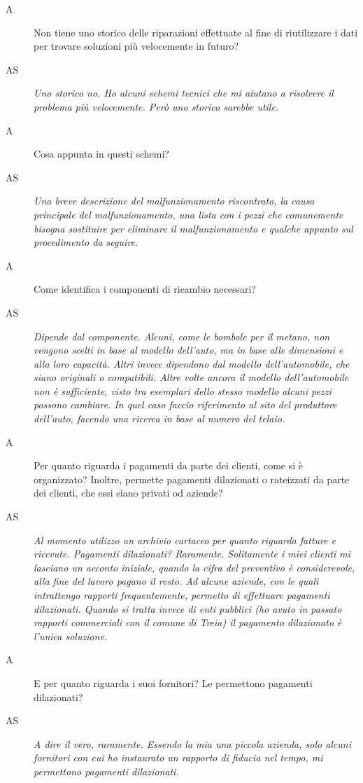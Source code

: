 \begin{description}
 			\item[A]
 				Non tiene uno storico delle riparazioni effettuate al fine di riutilizzare i dati per trovare soluzioni più velocemente in futuro?
 			\item[AS]
 				\emph{Uno storico no. Ho alcuni schemi tecnici che mi aiutano a risolvere il problema più velocemente. Però uno storico sarebbe utile.}
 			\item[A]
	 			Cosa appunta in questi schemi?
	 		\item[AS]
		 		\emph{Una breve descrizione del malfunzionamento riscontrato, la causa principale del malfunzionamento, una lista con i pezzi che comunemente bisogna sostituire per eliminare il malfunzionamento e qualche appunto sul procedimento da seguire.}
		 	\item[A]
			 	Come identifica i componenti di ricambio necessari?
			\item[AS]
				\emph{Dipende dal componente. Alcuni, come le bombole per il metano, non vengono scelti in base al modello dell'auto, ma in base alle dimensioni e alla loro capacità. Altri invece dipendono dal modello dell'automobile, che siano originali o compatibili. Altre volte ancora il modello dell'automobile non è sufficiente, visto tra esemplari dello stesso modello alcuni pezzi possono cambiare. In quel caso faccio riferimento al sito del produttore dell'auto, facendo una ricerca in base al numero del telaio.}
 			\item[A]
 				Per quanto riguarda i pagamenti da parte dei clienti, come si è organizzato? Inoltre, permette pagamenti dilazionati o rateizzati da parte dei clienti, che essi siano privati od aziende?
 			\item[AS]
 				\emph{Al momento utilizzo un archivio cartaceo per quanto riguarda fatture e ricevute. Pagamenti dilazionati? Raramente. Solitamente i miei clienti mi lasciano un acconto iniziale, quando la cifra del preventivo è considerevole, alla fine del lavoro pagano il resto. Ad alcune aziende, con le quali intrattengo rapporti frequentemente, permetto di effettuare pagamenti dilazionati. Quando si tratta invece di enti pubblici (ho avuto in passato rapporti commerciali con il comune di Treia) il pagamento dilazionato è l'unica soluzione.}
 			\item[A]
 				E per quanto riguarda i suoi fornitori? Le permettono pagamenti dilazionati?
 			\item[AS]
 				\emph{A dire il vero, raramente. Essendo la mia una piccola azienda, solo alcuni fornitori con cui ho instaurato un rapporto di fiducia nel tempo, mi permettono pagamenti dilazionati.}

\end{description}
